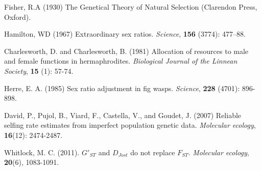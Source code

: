 \documentclass[25pt, a0paper, portrait, margin=0mm, innermargin=15mm,
     blockverticalspace=15mm, colspace=15mm, subcolspace=8mm]{tikzposter}
\begin{document}
\begin{columns}
{\begin{small}
  \hangindent=2cm Fisher, R.A (1930) The Genetical Theory of Natural Selection (Clarendon Press, Oxford).

  \hangindent=2cm Hamilton, WD (1967) Extraordinary sex ratios. 
  \textit{Science}, \textbf{156} (3774): 477–88.

  \hangindent=2cm Charlesworth, D. and Charlesworth, B. (1981) Allocation of resources to male and female functions in hermaphrodites. \textit{Biological Journal of the Linnean Society}, \textbf{15} (1): 57-74.
  
  \hangindent=2cm Herre, E. A. (1985) Sex ratio adjustment in fig wasps. \textit{Science}, \textbf{228} (4701): 896-898.

  \hangindent=2cm David, P., Pujol, B., Viard, F., Castella, V., and Goudet, J. (2007) Reliable selfing rate estimates from imperfect population genetic data. \textit{Molecular ecology}, \textbf{16}(12): 2474-2487.

  \hangindent=2cm Whitlock, M. C. (2011). $G'_{ST}$ and $D_{Jost}$ do not replace $F_{ST}$. \textit{Molecular ecology}, \textbf{20}(6), 1083-1091.
\end{small}
}

%	
%    


\end{columns}

\end{document}
